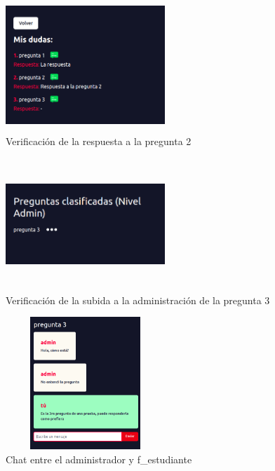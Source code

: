 \begin{figure}[h]
	\begin{center}
		\includegraphics[width=6cm, height=5cm]{respuesta2.png}
		\caption{Verificación de la respuesta a la pregunta 2}
		\label{fig:f_respuesta2}
		
	\end{center}
\end{figure}

\begin{figure}[h]
	\begin{center}
		\includegraphics[width=6cm, height=5cm]{verificar_subida3.png}
		\caption{Verificación de la subida a la administración de la pregunta 3}
		\label{fig:f_verificacion_admin}
		
	\end{center}
\end{figure}


\begin{figure}[h]
	\begin{center}
		\includegraphics[width=6cm, height=5cm]{chat_admin.png}
		\caption{Chat entre el administrador y f\_estudiante}
		\label{fig:f_chat_admin}
		
	\end{center}
\end{figure}

